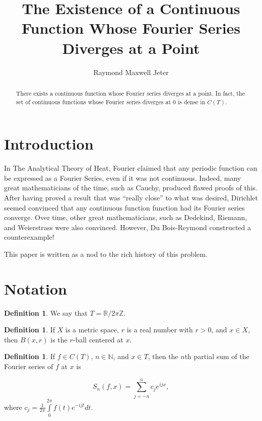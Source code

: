 \documentclass{amsart}
\newcommand{\N}{\mathbb{N}}
\newcommand{\R}{\mathbb{R}}
\newcommand{\Z}{\mathbb{Z}}
\theoremstyle{definition}
\newtheorem{definition}[thm]{Definition}
\begin{document}
\title[A Continuous Function Whose Fourier Series Diverges at a Point]{The Existence of a Continuous Function Whose Fourier Series Diverges at a Point}
\author{Raymond Maxwell Jeter}

\begin{abstract}
There exists a continuous function whose Fourier series diverges at a point. 
In fact, the set of continuous functions whose Fourier series diverges at $0$ is dense in $C(T)$.
\end{abstract}

\maketitle

\section{Introduction}

In The Analytical Theory of Heat, Fourier claimed that any periodic function can be expressed as a Fourier Series, even if it was not continuous. 
Indeed, many great mathematicians of the time, such as Cauchy, produced flawed proofs of this. 
After having proved a result that was ``really close'' to what was desired, Dirichlet seemed convinced that any continuous function function had its Fourier series converge.  
Over time, other great mathematicians, such as Dedekind, Riemann, and Weierstrass were also convinced. 
However, Du Bois-Reymond constructed a counterexample! ~\cite{Kor88}

This paper is written as a nod to the rich history of this problem.

\section{Notation}

\begin{definition}
We say that $T = \R / 2\pi \Z$.
\end{definition}

\begin{definition}
If $X$ is a metric space, $r$ is a real number with $r>0$, and $x \in X$, then $B(x,r)$ is the $r$-ball centered at $x$.
\end{definition}

\begin{definition}
If $f \in C(T)$, $n \in \N$, and $x \in T$, then the $n$th partial sum of the Fourier series of $f$ at $x$ is 

\begin{displaymath}
S_n(f,x) = \sum\limits_{j=-n}^n c_j e^{ijx},
\end{displaymath}
where $c_j = \frac{1}{2 \pi} \int\limits_0^{2\pi} f(t)e^{-ijt} dt$.
\end{definition}
\end{document}
